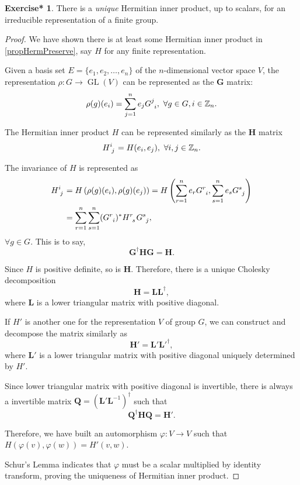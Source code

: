 \documentclass[12pt, letterpaper]{article}
\newcommand{\inte}{\mathbb{Z}}
\newcommand{\GL}{\operatorname{GL}}
\newcommand{\id}{\indices}
\newcommand{\hadj}[1]{{#1}^{\dagger}}
\theoremstyle{definition}
\theoremstyle{remark}
\theoremstyle{definition}
\newtheorem{exe*}[exe]{Exercise*}
\theoremstyle{plain}
\numberwithin{equation}{section}
\begin{document}
	\begin{exe*}\label{exe1.14}
		There is a \textit{unique} Hermitian inner product, up to scalars, for an irreducible representation of a finite group.
	\end{exe*}
	\begin{proof}
		We have shown there is at least some Hermitian inner product
		in \ref{propHermPreserve}, say $H$ for any finite representation.
		
		Given a basis set $E=\{e_1,e_2,\dots,e_n\}$ of the $n$-dimensional vector space $V$,
		the representation $\rho \colon G \to \GL(V)$ can be represented as the $\mathbf{G}$ matrix:
		\[\rho(g)(e_i)=\sum_{j=1}^{n}e_jG\id{^j_i},\,\,\forall g\in G, i\in \inte_n. \]
		
		The Hermitian inner product $H$ can be represented similarly as the $\mathbf{H}$ matrix
		\[ H\id{^i_j}=H(e_i,e_j),\,\,\forall i, j\in \inte_n. \]
		
		The invariance of $H$ is represented as
		\[\begin{aligned}
			H\id{^i_j}&=H\left(\rho(g)(e_i),\rho(g)(e_j)\right)
			=H\left(\sum_{r=1}^{n}e_rG\id{^r_i},\sum_{s=1}^{n}e_sG\id{^s_j}\right)\\
			&=\sum_{r=1}^n\sum_{s=1}^n(G\id{^r_i})^{*}H\id{^r_s}G\id{^s_j},
		\end{aligned}\]
		$\forall g\in G$. This is to say, \[\hadj{\mathbf{G}}\mathbf{H}\mathbf{G}=\mathbf{H}.\]
		
		Since $H$ is positive definite, so is $\mathbf{H}$.
		Therefore, there is a unique Cholesky decomposition
		\[\mathbf{H}=\mathbf{L}\hadj{\mathbf{L}},\]
		where $\mathbf{L}$ is a lower triangular matrix with positive diagonal.
		
		If $H'$ is another one for the representation $V$ of group $G$,
		we can construct and decompose the matrix similarly as
		\[\mathbf{H}'=\mathbf{L}'\hadj{\mathbf{L}'},\]
		where $\mathbf{L}'$ is a lower triangular matrix with positive diagonal uniquely determined by $H'$.
		
		Since lower triangular matrix with positive diagonal is invertible,
		there is always a invertible matrix $\mathbf{Q}=\hadj{\left(\mathbf{L}'\mathbf{L}^{-1}\right)}$
		such that
		\[\hadj{\mathbf{Q}}\mathbf{H}\mathbf{Q}=\mathbf{H}'.\]
		
		Therefore, we have built an automorphism $\varphi\colon V\to V$
		such that $H(\varphi (v), \varphi (w))=H'(v,w)$.
		
		Schur's Lemma indicates that $\varphi$ must be a scalar multiplied by identity transform,
		proving the uniqueness of Hermitian inner product.
		
		
	\end{proof}
\end{document}
